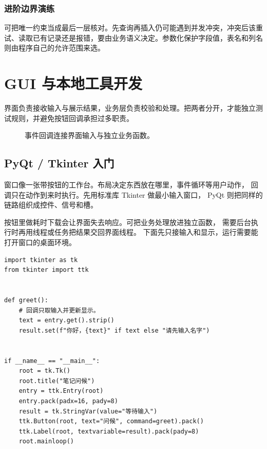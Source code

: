 \documentclass[UTF8,a4paper,oneside,openany,fontset=none,11pt]{ctexbook}
\newcommand{\code}[1]{\texttt{\detokenize{#1}}}
\begin{document}
\subsection*{进阶边界演练}
可把唯一约束当成最后一层核对。先查询再插入仍可能遇到并发冲突，冲突后该重试、读取已有记录还是报错，要由业务语义决定。参数化保护字段值，表名和列名则由程序自己的允许范围来选。

\chapter{GUI 与本地工具开发}
\label{ch:15-outline}

界面负责接收输入与展示结果，业务层负责校验和处理。把两者分开，才能独立测试规则，并避免按钮回调承担过多职责。


\begin{figure}[htbp]
  \centering
  \caption*{事件回调连接界面输入与独立业务函数。}
\end{figure}


\section{PyQt / Tkinter 入门}

窗口像一张带按钮的工作台。布局决定东西放在哪里，事件循环等用户动作，
回调只在动作到来时执行。先用标准库 Tkinter 做最小输入窗口，
PyQt 则把同样的链路组织成控件、信号和槽。

按钮里做耗时下载会让界面失去响应。可把业务处理放进独立函数，
需要后台执行时再用线程或任务把结果交回界面线程。
下面先只接输入和显示，运行需要能打开窗口的桌面环境。


\begin{lstlisting}[title={\code{window_demo.py}}]
import tkinter as tk
from tkinter import ttk


def greet():
    # 回调只取输入并更新显示。
    text = entry.get().strip()
    result.set(f"你好，{text}" if text else "请先输入名字")


if __name__ == "__main__":
    root = tk.Tk()
    root.title("笔记问候")
    entry = ttk.Entry(root)
    entry.pack(padx=16, pady=8)
    result = tk.StringVar(value="等待输入")
    ttk.Button(root, text="问候", command=greet).pack()
    ttk.Label(root, textvariable=result).pack(pady=8)
    root.mainloop()
\end{lstlisting}
\end{document}
